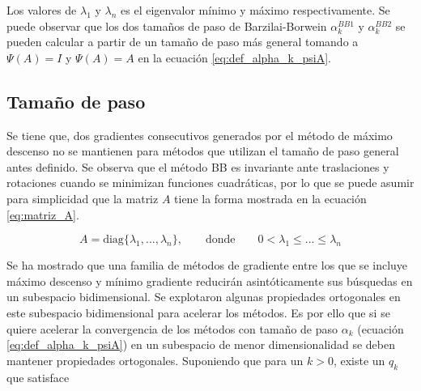 Los valores de $\lambda_1$ y $\lambda_n$ es el eigenvalor mínimo y máximo respectivamente. Se puede observar que los dos tamaños de paso de Barzilai-Borwein $\alpha_k^{BB1}$ y $\alpha_k^{BB2}$ se pueden calcular a partir de un tamaño de paso más general tomando a $\Psi(A) = I$ y $\Psi(A) = A$ en la ecuación \ref{eq:def_alpha_k_psiA}.


\subsection*{Tamaño de paso}


Se tiene que, dos gradientes consecutivos generados por el método de máximo descenso no se mantienen para métodos que utilizan el tamaño de paso general antes definido. Se observa que el método BB es invariante ante traslaciones y rotaciones cuando se minimizan funciones cuadráticas\cite{dai_2005}, por lo que se puede asumir para simplicidad que la matriz $A$ tiene la forma mostrada en la ecuación \ref{eq:matriz_A}.

\begin{equation}
    A = \text{diag}\{\lambda_1, ..., \lambda_n\}, \qquad \text{donde} \qquad 0<\lambda_1\leq...\leq\lambda_n \label{eq:matriz_A}
\end{equation}

Se ha mostrado que una familia de métodos de gradiente entre los que se incluye máximo descenso y mínimo gradiente reducirán asintóticamente sus búsquedas en un subespacio bidimensional. Se explotaron algunas propiedades ortogonales en este subespacio bidimensional para acelerar los métodos\cite{huang_2022}. %
Es por ello que si se quiere acelerar la convergencia de los métodos con tamaño de paso $\alpha_k$ (ecuación \ref{eq:def_alpha_k_psiA}) en un subespacio de menor dimensionalidad se deben mantener propiedades ortogonales. Suponiendo que para un $k>0$, existe un $q_k$ que satisface

